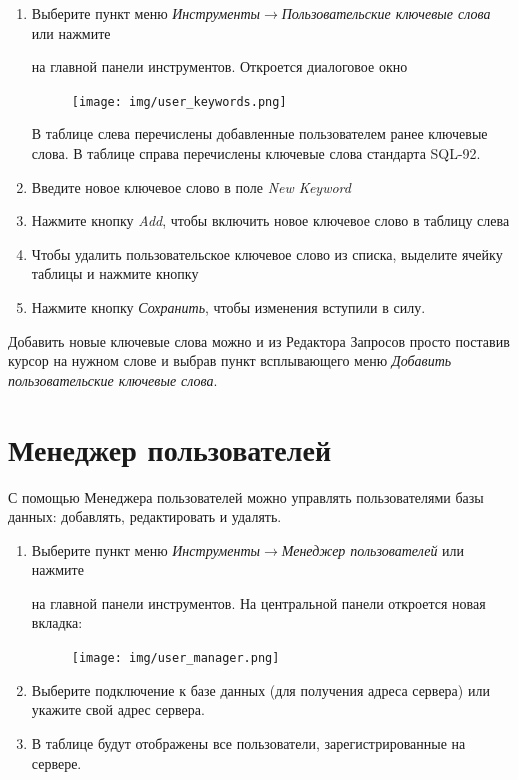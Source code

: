 \begin{enumerate}[leftmargin=39pt]
	\item Выберите пункт меню \textit{Инструменты}$\rightarrow$\textit{Пользовательские ключевые слова} или нажмите  на главной панели инструментов. Откроется диалоговое окно
	\begin{figure}[H]
		\centering
		\texttt{[image: img/user\_keywords.png]}
	\end{figure}
	В таблице слева перечислены добавленные пользователем ранее ключевые слова. В таблице справа перечислены ключевые слова стандарта SQL-92.
	\item Введите новое ключевое слово в поле \textit{New Keyword}
	\item Нажмите кнопку \textit{Add}, чтобы включить новое ключевое слово в таблицу слева
	\item Чтобы удалить пользовательское ключевое слово из списка, выделите ячейку таблицы и нажмите кнопку 
	\item Нажмите кнопку \textit{Сохранить}, чтобы изменения вступили в силу.
\end{enumerate}

\begin{redremark}
	Добавить новые ключевые слова можно и из Редактора Запросов просто поставив курсор на нужном слове и выбрав пункт всплывающего меню \textit{Добавить пользовательские ключевые слова}.
\end{redremark}	

\newpage

\section{Менеджер пользователей}\label{sec:user_manager}
С помощью Менеджера пользователей можно управлять пользователями базы данных: добавлять, редактировать и удалять. 
\begin{enumerate}[leftmargin=39pt]
	\item Выберите пункт меню \textit{Инструменты}$\rightarrow$\textit{Менеджер пользователей} или нажмите  на главной панели инструментов. На центральной панели откроется новая вкладка:
	\begin{figure}[H]
		\flushright
		\texttt{[image: img/user\_manager.png]}
	\end{figure}
	\item Выберите подключение к базе данных (для получения адреса сервера) или укажите свой адрес сервера.
	\item В таблице будут отображены все пользователи, зарегистрированные на сервере.
\end{enumerate}	

